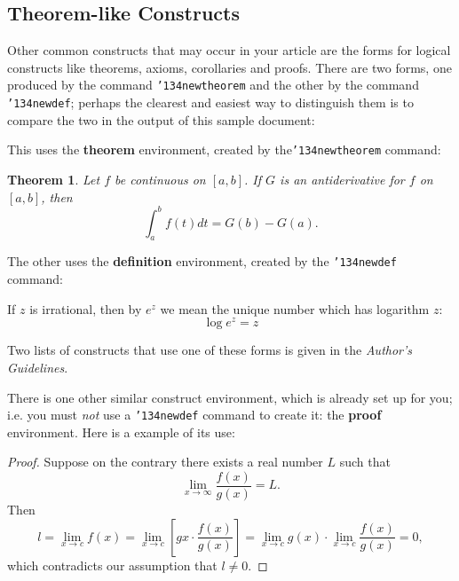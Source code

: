 \documentclass{nime-alternate}
\begin{document}
\subsection{Theorem-like Constructs}
Other common constructs that may occur in your article are
the forms for logical constructs like theorems, axioms,
corollaries and proofs.  There are
two forms, one produced by the
command \texttt{{\char'134}newtheorem} and the
other by the command \texttt{{\char'134}newdef}; perhaps
the clearest and easiest way to distinguish them is
to compare the two in the output of this sample document:

This uses the \textbf{theorem} environment, created by
the\linebreak\texttt{{\char'134}newtheorem} command:
\newtheorem{theorem}{Theorem}
\begin{theorem}
Let $f$ be continuous on $[a,b]$.  If $G$ is
an antiderivative for $f$ on $[a,b]$, then
\begin{displaymath}\int^b_af(t)dt = G(b) - G(a).\end{displaymath}
\end{theorem}

The other uses the \textbf{definition} environment, created
by the \texttt{{\char'134}newdef} command:
\begin{definition}
If $z$ is irrational, then by $e^z$ we mean the
unique number which has
logarithm $z$: \begin{displaymath}{\log e^z = z}\end{displaymath}
\end{definition}

Two lists of constructs that use one of these
forms is given in the
\textit{Author's  Guidelines}.
 
There is one other similar construct environment, which is
already set up
for you; i.e. you must \textit{not} use
a \texttt{{\char'134}newdef} command to
create it: the \textbf{proof} environment.  Here
is a example of its use:
\begin{proof}
Suppose on the contrary there exists a real number $L$ such that
\begin{displaymath}
\lim_{x\rightarrow\infty} \frac{f(x)}{g(x)} = L.
\end{displaymath}
Then
\begin{displaymath}
l=\lim_{x\rightarrow c} f(x)
= \lim_{x\rightarrow c}
\left[ g{x} \cdot \frac{f(x)}{g(x)} \right ]
= \lim_{x\rightarrow c} g(x) \cdot \lim_{x\rightarrow c}
\frac{f(x)}{g(x)} = 0,
\end{displaymath}
which contradicts our assumption that $l\neq 0$.
\end{proof}
\end{document}
